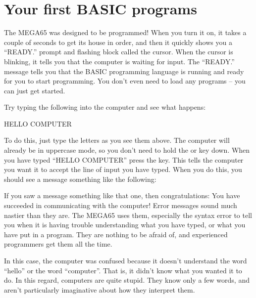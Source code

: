 \section{Your first BASIC programs}

The MEGA65 was designed to be programmed! When you turn it on,
it takes a couple of seconds to get its house in order, and then
it quickly shows you a ``READY.'' prompt and flashing block called
the cursor.  When the cursor is blinking, it tells you that the
computer is waiting for input.  The ``READY.'' message tells you
that the BASIC programming language is running and ready for you to
start programming.  You don't even need to load any programs --
you can just get started.

\needspace{4cm} %
Try typing the following into the computer and see what happens:

\begin{screenoutput}
HELLO COMPUTER
\end{screenoutput}

\needspace{4cm} %

To do this, just type the letters as you see them above.  The computer
will already be in uppercase mode, so you don't need to hold the 
or  key down.  When you have typed ``HELLO COMPUTER'' press
  the  key.  This tells the computer you want it to accept the
  line of input you have typed.  When you do this, you should see a message something
  like the following:


  If you saw a  message something like that one, then congratulations:
  You have succeeded in communicating with the computer!
  Error messages sound much nastier than they are.  The MEGA65 uses them, especially
  the syntax error to tell you when it is having trouble understanding what you have
  typed, or what you have put in a program.  They are nothing to be afraid of, and
  experienced programmers get them all the time.

  In this case, the computer was confused because it doesn't understand the word
  ``hello'' or the word ``computer''.  That is, it didn't know what you wanted it to
  do.  In this regard, computers are quite stupid. They know only a few words, and
  aren't particularly imaginative about how they interpret them.

